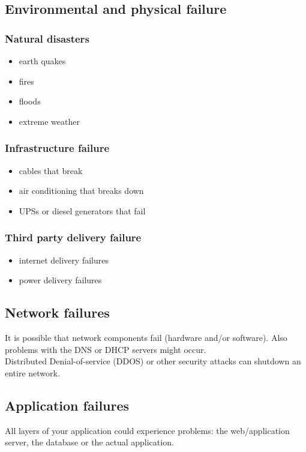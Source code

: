 \documentclass[12pt]{report}
\begin{document}
\subsection{Environmental and physical failure}
\subsubsection{Natural disasters}
\begin{itemize}
\item earth quakes
\item fires
\item floods
\item extreme weather
\end{itemize}
\subsubsection{Infrastructure failure}
\begin{itemize}
\item cables that break
\item air conditioning that breaks down
\item UPSs or diesel generators that fail
\end{itemize}
\subsubsection{Third party delivery failure}
\begin{itemize}
\item internet delivery failures
\item power delivery failures
\end{itemize}

\subsection{Network failures}
It is possible that network components fail (hardware and/or
software). Also problems with the DNS or DHCP servers might occur.\\
Distributed Denial-of-service (DDOS) or other security 
 attacks can shutdown an entire network.

\subsection{Application failures}
All layers of your application could experience problems: the web/application
server, the database or the actual application.
\end{document}

